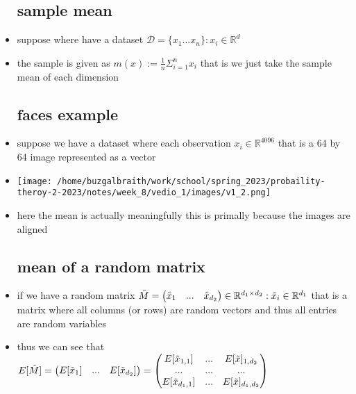 \documentclass{article}
\begin{document}
\begin{itemize}
\subsection*{sample mean}
\item suppose where have a dataset $\mathcal{D}=\{x_1...x_n\}:x_i\in \mathbb{R}^{d}$
\item the sample is given as $m(x):=\frac{1}{n}\Sigma_{i=1}^{n}x_i$ that is we just take the sample mean of each dimension
\subsection*{faces example}
\item suppose we have a dataset where each observation $x_i\in \mathbb{R}^{4096}$ that is a 64 by 64 image represented as a vector
\item \texttt{[image: /home/buzgalbraith/work/school/spring\_2023/probaility-theroy-2-2023/notes/week\_8/vedio\_1/images/v1\_2.png]}
\item here the mean is actually meaningfully this is primally because the images are aligned
\subsection*{mean of a random matrix}
\item if we have a random matrix $\Tilde{M}=\begin{pmatrix}
    \Tilde{x}_1& ...& \tilde{x}_{d_2}
\end{pmatrix}\in \mathbb{R}^{d_1\times d_2}:\tilde{x}_i\in \mathbb{R}^{d_1}$ that is a matrix where all columns (or rows) are random vectors and thus all entries are random variables 
\item thus we can see that  $E[\Tilde{M}]=\begin{pmatrix}
    E[\Tilde{x}_1]& ...& E[\tilde{x}_{d_2}]
\end{pmatrix}=\begin{pmatrix}
    E[\tilde{x}_{1,1}] & ... & E[\Tilde{x}]_{1,d_2}\\...&...&...\\E[\tilde{x}_{d_1,1}] & ... & E[\Tilde{x}]_{d_1,d_2}
\end{pmatrix}$

\end{itemize}
\end{document}
